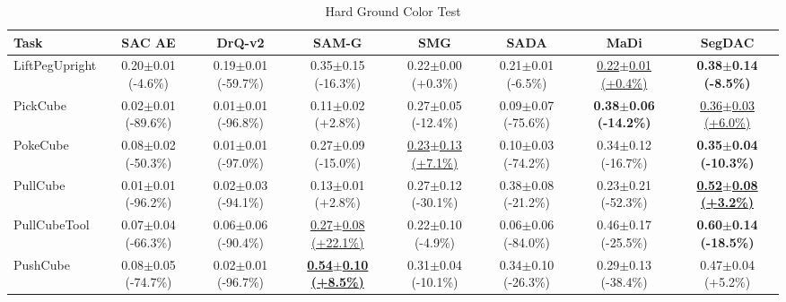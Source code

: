 \begin{table}[htbp]
\centering
\scriptsize
\caption{Hard Ground Color Test}
\label{tab:appendix_groundcolortest_hard}
\begin{adjustbox}{max width=\textwidth}
\begin{tabular}{l*{7}{c}}
\toprule
\textbf{Task} & \textbf{SAC AE} & \textbf{DrQ-v2} & \textbf{SAM-G} & \textbf{SMG} & \textbf{SADA} & \textbf{MaDi} & \textbf{SegDAC} \\
\midrule
LiftPegUpright & 0.20$\pm$0.01 \scriptsize{(-4.6\%)} & 0.19$\pm$0.01 \scriptsize{(-59.7\%)} & 0.35$\pm$0.15 \scriptsize{(-16.3\%)} & 0.22$\pm$0.00 \scriptsize{(+0.3\%)} & 0.21$\pm$0.01 \scriptsize{(-6.5\%)} & \underline{0.22$\pm$0.01 \scriptsize{(+0.4\%)}} & \textbf{0.38$\pm$0.14 \scriptsize{(-8.5\%)}} \\
PickCube & 0.02$\pm$0.01 \scriptsize{(-89.6\%)} & 0.01$\pm$0.01 \scriptsize{(-96.8\%)} & 0.11$\pm$0.02 \scriptsize{(+2.8\%)} & 0.27$\pm$0.05 \scriptsize{(-12.4\%)} & 0.09$\pm$0.07 \scriptsize{(-75.6\%)} & \textbf{0.38$\pm$0.06 \scriptsize{(-14.2\%)}} & \underline{0.36$\pm$0.03 \scriptsize{(+6.0\%)}} \\
PokeCube & 0.08$\pm$0.02 \scriptsize{(-50.3\%)} & 0.01$\pm$0.01 \scriptsize{(-97.0\%)} & 0.27$\pm$0.09 \scriptsize{(-15.0\%)} & \underline{0.23$\pm$0.13 \scriptsize{(+7.1\%)}} & 0.10$\pm$0.03 \scriptsize{(-74.2\%)} & 0.34$\pm$0.12 \scriptsize{(-16.7\%)} & \textbf{0.35$\pm$0.04 \scriptsize{(-10.3\%)}} \\
PullCube & 0.01$\pm$0.01 \scriptsize{(-96.2\%)} & 0.02$\pm$0.03 \scriptsize{(-94.1\%)} & 0.13$\pm$0.01 \scriptsize{(+2.8\%)} & 0.27$\pm$0.12 \scriptsize{(-30.1\%)} & 0.38$\pm$0.08 \scriptsize{(-21.2\%)} & 0.23$\pm$0.21 \scriptsize{(-52.3\%)} & \textbf{\underline{0.52$\pm$0.08 \scriptsize{(+3.2\%)}}} \\
PullCubeTool & 0.07$\pm$0.04 \scriptsize{(-66.3\%)} & 0.06$\pm$0.06 \scriptsize{(-90.4\%)} & \underline{0.27$\pm$0.08 \scriptsize{(+22.1\%)}} & 0.22$\pm$0.10 \scriptsize{(-4.9\%)} & 0.06$\pm$0.06 \scriptsize{(-84.0\%)} & 0.46$\pm$0.17 \scriptsize{(-25.5\%)} & \textbf{0.60$\pm$0.14 \scriptsize{(-18.5\%)}} \\
PushCube & 0.08$\pm$0.05 \scriptsize{(-74.7\%)} & 0.02$\pm$0.01 \scriptsize{(-96.7\%)} & \textbf{\underline{0.54$\pm$0.10 \scriptsize{(+8.5\%)}}} & 0.31$\pm$0.04 \scriptsize{(-10.1\%)} & 0.34$\pm$0.10 \scriptsize{(-26.3\%)} & 0.29$\pm$0.13 \scriptsize{(-38.4\%)} & 0.47$\pm$0.04 \scriptsize{(+5.2\%)} \\

\end{tabular}
\end{adjustbox}
\end{table}
